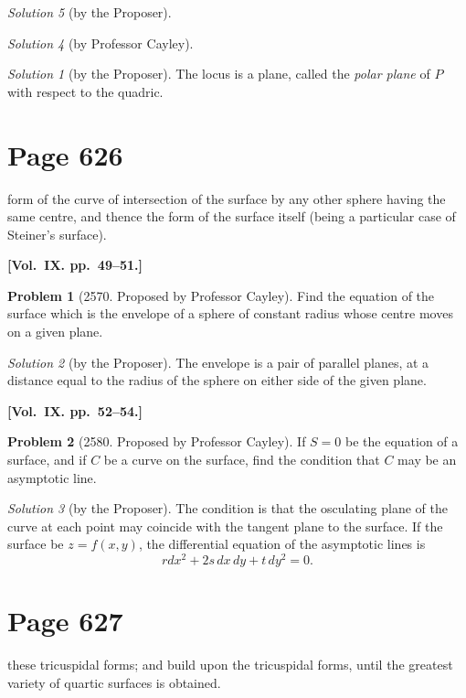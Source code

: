 \documentclass[12pt,a4paper]{article}
\theoremstyle{plain}
\theoremstyle{definition}
\newtheorem{problem}{Problem}
\theoremstyle{remark}
\newtheorem*{solution}{Solution}
\begin{document}
\begin{solution}[by the Proposer]
\begin{solution}[by Professor Cayley]
\begin{solution}[by the Proposer]
The locus is a plane, called the \textit{polar plane} of $P$ with respect to the quadric.
\end{solution}

\section*{Page 626}
\setcounter{page}{626}

form of the curve of intersection of the surface by any other sphere having the same centre, and thence the form of the surface itself (being a particular case of Steiner's surface).

\medskip\noindent\textbf{[Vol.~IX. pp.~49--51.]}

\begin{problem}[2570. Proposed by Professor Cayley]
Find the equation of the surface which is the envelope of a sphere of constant radius whose centre moves on a given plane.
\end{problem}

\begin{solution}[by the Proposer]
The envelope is a pair of parallel planes, at a distance equal to the radius of the sphere on either side of the given plane.
\end{solution}

\medskip\noindent\textbf{[Vol.~IX. pp.~52--54.]}

\begin{problem}[2580. Proposed by Professor Cayley]
If $S = 0$ be the equation of a surface, and if $C$ be a curve on the surface, find the condition that $C$ may be an asymptotic line.
\end{problem}

\begin{solution}[by the Proposer]
The condition is that the osculating plane of the curve at each point may coincide with the tangent plane to the surface. If the surface be $z = f(x, y)$, the differential equation of the asymptotic lines is
\[
rdx^2 + 2s\,dx\,dy + t\,dy^2 = 0.
\]
\end{solution}

\section*{Page 627}
\setcounter{page}{627}

these tricuspidal forms; and build upon the tricuspidal forms, until the greatest variety of quartic surfaces is obtained.


\end{solution}
\end{solution}
\end{document}
